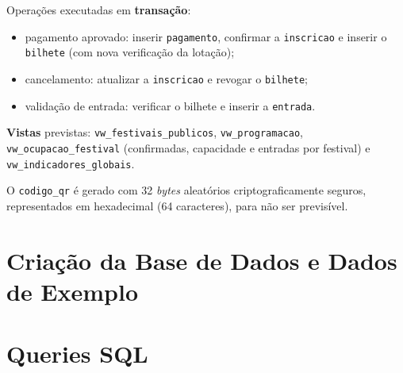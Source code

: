 \noindent Operações executadas em \textbf{transação}:
\begin{itemize}
  \item pagamento aprovado: inserir \texttt{pagamento}, confirmar a
        \texttt{inscricao} e inserir o \texttt{bilhete} (com nova verificação
        da lotação);
  \item cancelamento: atualizar a \texttt{inscricao} e revogar o
        \texttt{bilhete};
  \item validação de entrada: verificar o bilhete e inserir a
        \texttt{entrada}.
\end{itemize}

\noindent \textbf{Vistas} previstas: \texttt{vw\_festivais\_publicos},
\texttt{vw\_programacao}, \texttt{vw\_ocupacao\_festival} (confirmadas,
capacidade e entradas por festival) e \texttt{vw\_indicadores\_globais}.

\noindent O \texttt{codigo\_qr} é gerado com 32 \emph{bytes} aleatórios
criptograficamente seguros, representados em hexadecimal (64 caracteres), para
não ser previsível.

\section{Criação da Base de Dados e Dados de Exemplo}


\section{Queries SQL}

